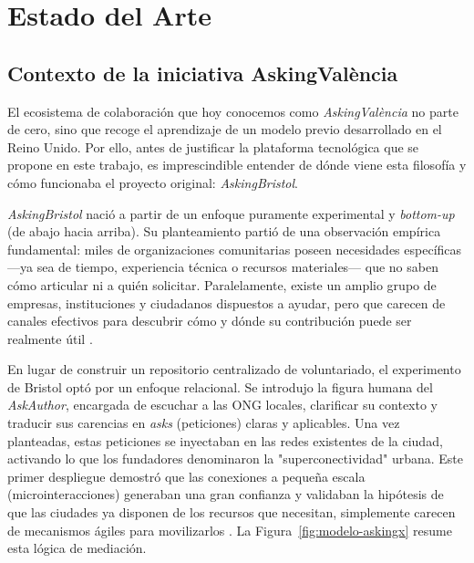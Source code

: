 \documentclass[11pt,oneside,spanish,listoffigures,listoftables]{tfgetsinf}
\begin{document}
\chapter{Estado del Arte}

\section{Contexto de la iniciativa AskingValència}

El ecosistema de colaboración que hoy conocemos como \textit{AskingValència} no parte de cero, sino que recoge el aprendizaje de un modelo previo desarrollado en el Reino Unido. Por ello, antes de justificar la plataforma tecnológica que se propone en este trabajo, es imprescindible entender de dónde viene esta filosofía y cómo funcionaba el proyecto original: \textit{AskingBristol}.

\textit{AskingBristol} nació a partir de un enfoque puramente experimental y \textit{bottom-up} (de abajo hacia arriba). Su planteamiento partió de una observación empírica fundamental: miles de organizaciones comunitarias poseen necesidades específicas —ya sea de tiempo, experiencia técnica o recursos materiales— que no saben cómo articular ni a quién solicitar. Paralelamente, existe un amplio grupo de empresas, instituciones y ciudadanos dispuestos a ayudar, pero que carecen de canales efectivos para descubrir cómo y dónde su contribución puede ser realmente útil \cite{social_innovation_bristol}.

En lugar de construir un repositorio centralizado de voluntariado, el experimento de Bristol optó por un enfoque relacional. Se introdujo la figura humana del \textit{AskAuthor}, encargada de escuchar a las ONG locales, clarificar su contexto y traducir sus carencias en \textit{asks} (peticiones) claras y aplicables. Una vez planteadas, estas peticiones se inyectaban en las redes existentes de la ciudad, activando lo que los fundadores denominaron la "superconectividad" urbana. Este primer despliegue demostró que las conexiones a pequeña escala (microinteracciones) generaban una gran confianza y validaban la hipótesis de que las ciudades ya disponen de los recursos que necesitan, simplemente carecen de mecanismos ágiles para movilizarlos \cite[págs. 3-5]{canos_manley_2024}. La Figura~\ref{fig:modelo-askingx} resume esta lógica de mediación.
\end{document}
